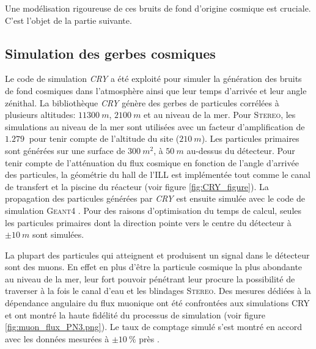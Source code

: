 Une modélisation rigoureuse de ces bruits de fond d'origine cosmique est cruciale. C'est l'objet de la partie suivante.

\bigbreak


\subsection{Simulation des gerbes cosmiques}

Le code de simulation \textit{CRY} \cite{CRY} a été exploité pour simuler la génération des bruits de fond cosmiques dans l'atmosphère ainsi que leur temps d'arrivée et leur angle zénithal. La bibliothèque \textit{CRY} génère des gerbes de particules corrélées à plusieurs altitudes: $\SI{11300}{m}$, $\SI{2100}{m}$ et au niveau de la mer. Pour \textsc{Stereo}, les simulations au niveau de la mer sont utilisées avec un facteur d'amplification de $\SI{1.279}{}$ pour tenir compte de l'altitude du site ($\SI{210}{m}$). Les particules primaires sont générées sur une surface de $\SI{300}{m^2}$, à $\SI{50}{m}$ au-dessus du détecteur. Pour tenir compte de l'atténuation du flux cosmique en fonction de l'angle d'arrivée des particules, la géométrie du hall de l'ILL est implémentée tout comme le canal de transfert et la piscine du réacteur (voir figure \ref{fig:CRY_figure}). La propagation des particules générées par \textit{CRY} est ensuite simulée avec le code de simulation \textsc{Geant4} \cite{docdb354}. Pour des raisons d'optimisation du temps de calcul, seules les particules primaires dont la direction pointe vers le centre du détecteur à $\pm \SI{10}{m}$ sont simulées.

\bigbreak


La plupart des particules qui atteignent et produisent un signal dans le détecteur sont des muons. En effet en plus d'être la particule cosmique la plus abondante au niveau de la mer, leur fort pouvoir pénétrant leur procure la possibilité de traverser à la fois le canal d'eau et les blindages \textsc{Stereo}. Des mesures dédiées à la dépendance angulaire du flux muonique ont été confrontées aux simulations CRY \cite{zsoldos:tel-01575951} et ont montré la haute fidélité du processus de simulation (voir figure \ref{fig:muon_flux_PN3.png}). Le taux de comptage simulé s'est montré en accord avec les données mesurées à $\pm \SI{10}{\%}$ près \cite{docdb354}.\\

